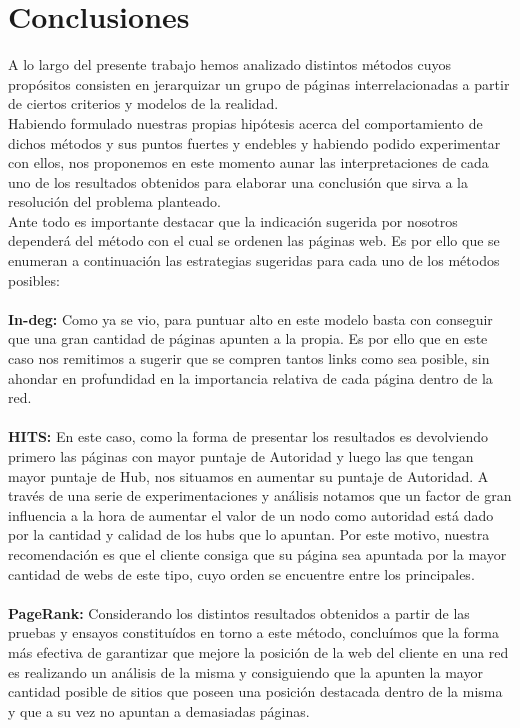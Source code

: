 \documentclass[a4paper]{article}
\begin{document}
\section{Conclusiones}
A lo largo del presente trabajo hemos analizado distintos métodos cuyos propósitos consisten en jerarquizar un grupo de páginas interrelacionadas a partir de ciertos criterios y modelos de la realidad. \\
\indent Habiendo formulado nuestras propias hipótesis acerca del comportamiento de dichos métodos y sus puntos fuertes y endebles y habiendo podido experimentar con ellos, nos proponemos en este momento aunar las interpretaciones de cada uno de los resultados obtenidos para elaborar una conclusión que sirva a la resolución del problema planteado.\\
\indent Ante todo es importante destacar que la indicación sugerida por nosotros dependerá del método con el cual se ordenen las páginas web. Es por ello que se enumeran a continuación las estrategias sugeridas para cada uno de los métodos posibles:\\
\\
\indent \textbf{In-deg:} Como ya se vio, para puntuar alto en este modelo basta con conseguir que una gran cantidad de páginas apunten a la propia. Es por ello que en este caso nos remitimos a sugerir que se compren tantos links como sea posible, sin ahondar en profundidad en la importancia relativa de cada página dentro de la red.\\
\\
\indent \textbf{HITS:} En este caso, como la forma de presentar los resultados es devolviendo primero las p\'aginas con mayor puntaje de Autoridad y luego las que tengan mayor puntaje de Hub, nos situamos en aumentar su puntaje de Autoridad. A través de una serie de experimentaciones y análisis notamos que un factor de gran influencia a la hora de aumentar el valor de un nodo como autoridad está dado por la cantidad y calidad de los hubs que lo apuntan. Por este motivo, nuestra recomendación es que el cliente consiga que su página sea apuntada por la mayor cantidad de webs de este tipo, cuyo orden se encuentre entre los principales.\\
\\
\indent  \textbf{PageRank:} Considerando los distintos resultados obtenidos a partir de las pruebas y ensayos constituídos en torno a este método, concluímos que la forma más efectiva de garantizar que mejore la posición de la web del cliente en una red es realizando un análisis de la misma y consiguiendo que la apunten la mayor cantidad posible de sitios que poseen una posición destacada dentro de la misma y que a su vez no apuntan a demasiadas páginas. \\
\end{document}
